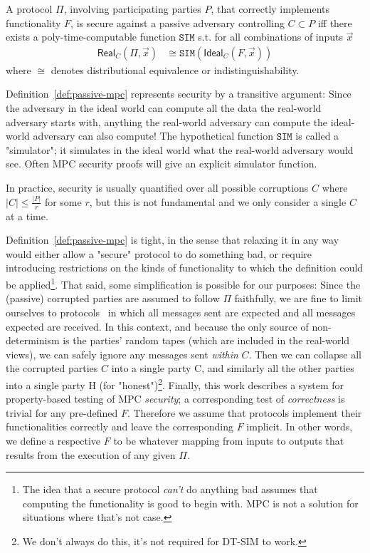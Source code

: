 \documentclass[acmlarge, manuscript, screen, review, anonymous, table]{acmart}
\newcommand{\toolname}{\textsc{DT-SIM}\xspace}
\begin{document}
\begin{definition}\label{def:passive-mpc}
  \begin{samepage}
    A protocol $Π$,
    involving participating parties $P$,
    that correctly implements functionality $F$,
    is secure against a passive adversary controlling $C \subset P$ iff
    there exists a poly-time-computable function $\mathtt{SIM}$ s.t.
    for all combinations of inputs $\vec{x}$
    $$\begin{aligned}
        \mathsf{Real}_C(Π, \vec{x}) &\cong \mathtt{SIM}(\mathsf{Ideal}_C(F,\vec{x}))
    \end{aligned}$$
    where $\cong$ denotes distributional equivalence or indistinguishability.
  \end{samepage}
\end{definition}

Definition~\ref{def:passive-mpc} represents security by a transitive argument:
Since the adversary in the ideal world can compute all the data the real-world adversary starts with,
anything the real-world adversary can compute the ideal-world adversary can also compute!
The hypothetical function $\mathtt{SIM}$ is called a "simulator";
it simulates in the ideal world what the real-world adversary would see.
Often MPC security proofs will give an explicit simulator function.

In practice, security is usually quantified over all possible corruptions $C$
where $\lvert C \rvert \leq \frac{\lvert P \rvert}{r}$ for some $r$, but this is not fundamental and we only consider a single $C$ at a time.

Definition~\ref{def:passive-mpc} is tight, in the sense that relaxing it in any way would either
allow a "secure" protocol to do something bad, or require introducing restrictions
on the kinds of functionality to which the definition could be applied\footnote{
    The idea that a secure protocol \emph{can't} do anything bad assumes that computing the functionality is good to begin with.
    MPC is not a solution for situations where that's not case.
}.
That said, some simplification is possible for our purposes:
Since the (passive) corrupted parties are assumed to follow $Π$ faithfully, we are fine to limit ourselves to
 protocols~\cite{montesi_2023} in which all messages sent are expected and all messages expected are received.
In this context, and because the only source of non-determinism is the parties' random tapes
(which are included in the real-world views),
we can safely ignore any messages sent \emph{within} $C$.
Then we can collapse all the corrupted parties $C$ into a single party $\mathrm{C}$,
and similarly all the other parties into a single party $\mathrm{H}$ (for "honest")\footnote{
    We don't always do this, it's not required for \toolname to work.
}.
Finally, this work describes a system for property-based testing of MPC \emph{security};
a corresponding test of \emph{correctness} is trivial for any pre-defined $F$.
Therefore we assume that protocols implement their functionalities correctly and leave the corresponding $F$ implicit.
In other words, we define a respective $F$ to be whatever mapping from inputs to outputs that results from the execution of any given $Π$.
\end{document}
